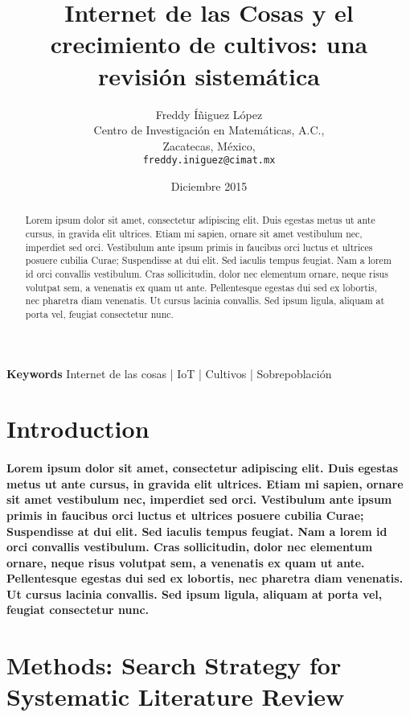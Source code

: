 \documentclass[11pt, twocolumn]{article}
\begin{document}
\title{Internet de las Cosas y el crecimiento de cultivos: una revisión sistemática}
\author{Freddy Íñiguez López\\
	Centro de Investigación en Matemáticas, A.C.,\\
	Zacatecas, México,\\
	\texttt{freddy.iniguez@cimat.mx}}
\date{Diciembre 2015}
\maketitle

\begin{abstract}
Lorem ipsum dolor sit amet, consectetur adipiscing elit. Duis egestas metus ut ante cursus, in gravida elit ultrices. Etiam mi sapien, ornare sit amet vestibulum nec, imperdiet sed orci. Vestibulum ante ipsum primis in faucibus orci luctus et ultrices posuere cubilia Curae; Suspendisse at dui elit. Sed iaculis tempus feugiat. Nam a lorem id orci convallis vestibulum. Cras sollicitudin, dolor nec elementum ornare, neque risus volutpat sem, a venenatis ex quam ut ante. Pellentesque egestas dui sed ex lobortis, nec pharetra diam venenatis. Ut cursus lacinia convallis. Sed ipsum ligula, aliquam at porta vel, feugiat consectetur nunc.
\end{abstract}

\textbf{Keywords} Internet de las cosas | IoT | Cultivos | Sobrepoblación 

\section{Introduction}
\paragraph{Lorem ipsum dolor sit amet, consectetur adipiscing elit. Duis egestas metus ut ante cursus, in gravida elit ultrices. Etiam mi sapien, ornare sit amet vestibulum nec, imperdiet sed orci. Vestibulum ante ipsum primis in faucibus orci luctus et ultrices posuere cubilia Curae; Suspendisse at dui elit. Sed iaculis tempus feugiat. Nam a lorem id orci convallis vestibulum. Cras sollicitudin, dolor nec elementum ornare, neque risus volutpat sem, a venenatis ex quam ut ante. Pellentesque egestas dui sed ex lobortis, nec pharetra diam venenatis. Ut cursus lacinia convallis. Sed ipsum ligula, aliquam at porta vel, feugiat consectetur nunc.}

\section{Methods: Search Strategy for Systematic Literature Review}
\end{document}
